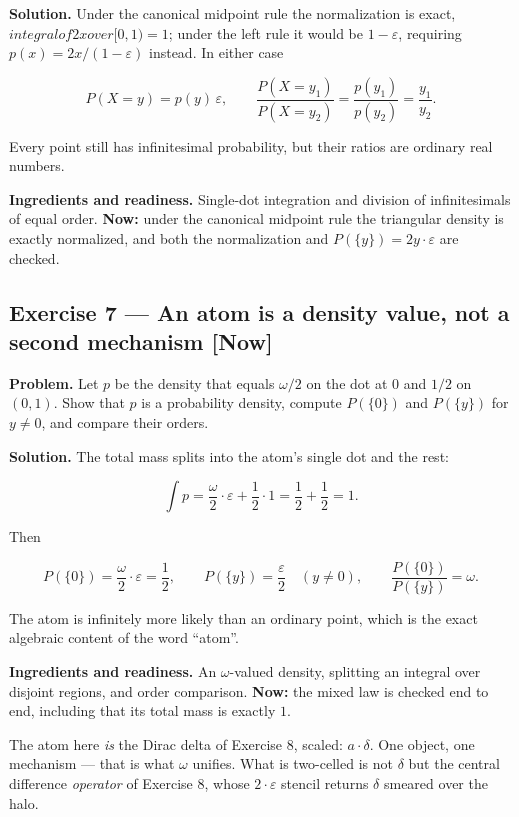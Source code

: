 \documentclass[11pt]{article}
\newcommand{\eps}{\varepsilon}
\renewcommand{\epsilon}{\varepsilon}
\begin{document}
\textbf{Solution.} Under the canonical midpoint rule the normalization is exact,
$integral of 2x over [0,1) = 1$; under the left rule it would be $1 - \eps$,
requiring $p(x) = 2x/(1-\eps)$ instead. In either case

\[
P(X=y)=p(y)\,\epsilon,
\qquad
\frac{P(X=y_1)}{P(X=y_2)}=\frac{p(y_1)}{p(y_2)}=\frac{y_1}{y_2}.
\]

Every point still has infinitesimal probability, but their ratios are ordinary
real numbers.

\textbf{Ingredients and readiness.} Single-dot integration and division of
infinitesimals of equal order. \textbf{Now:} under the canonical midpoint rule the
triangular density is exactly normalized, and both the normalization and
$P(\{y\}) = 2y\cdot \eps$ are checked.


\subsection*{Exercise 7 --- An atom is a density value, not a second mechanism \hfill \normalfont\small[Now]}

\textbf{Problem.} Let $p$ be the density that equals $\omega/2$ on the dot at $0$
and $1/2$ on $(0,1)$. Show that $p$ is a probability density, compute
$P(\{0\})$ and $P(\{y\})$ for $y \neq  0$, and compare their orders.

\textbf{Solution.} The total mass splits into the atom's single dot and the rest:

\[
\int p=\frac\omega2\cdot\epsilon+\frac12\cdot 1=\frac12+\frac12=1 .
\]

Then

\[
P(\{0\})=\frac\omega2\cdot\epsilon=\frac12,
\qquad
P(\{y\})=\frac\epsilon2 \quad (y\neq0),
\qquad
\frac{P(\{0\})}{P(\{y\})}=\omega .
\]

The atom is infinitely more likely than an ordinary point, which is the exact
algebraic content of the word ``atom''.

\textbf{Ingredients and readiness.} An $\omega$-valued density, splitting an
integral over disjoint regions, and order comparison. \textbf{Now:} the mixed law is
checked end to end, including that its total mass is exactly $1$.

The atom here \emph{is} the Dirac delta of Exercise 8, scaled: $a\cdot \delta$. One
object, one mechanism --- that is what $\omega$ unifies. What is two-celled is not
$\delta$ but the central difference \emph{operator} of Exercise 8, whose $2\cdot \eps$
stencil returns $\delta$ smeared over the halo.
\end{document}
